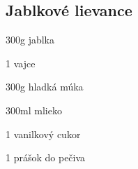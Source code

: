 
\setcounter{step}{0}
\subsection{Jablkové lievance}

\begin{ingredient}
\begin{main}
	\item 300g jablka
	\item 1 vajce
	\item 300g hladká múka
	\item 300ml mlieko
	\item 1 vanilkový cukor
	\item 1 prášok do pečiva
\end{main}
\end{ingredient}%
\begin{recipe}


\end{recipe}

\begin{notes}

\end{notes}	
